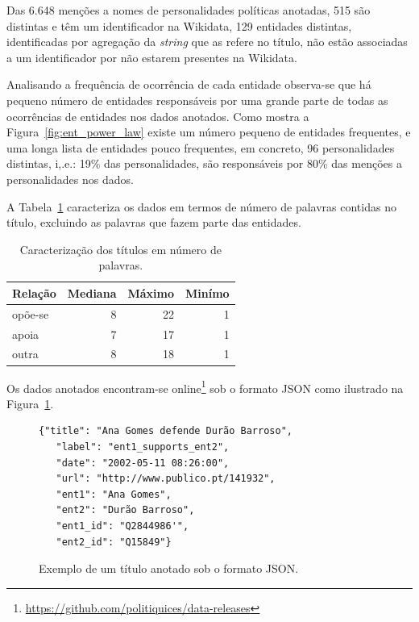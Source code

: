 \documentclass[a4paper, twocolumn, 11pt, twoside]{article}
\begin{document}
Das 6.648 menções a nomes de personalidades políticas anotadas, 515 são distintas e têm um identificador na Wikidata, 129 entidades distintas, identificadas por agregação da \textit{string} que as refere no título, não estão associadas a um identificador por não estarem presentes na Wikidata. 

Analisando a frequência de ocorrência de cada entidade observa-se que há pequeno número de entidades responsáveis por uma grande parte de todas as ocorrências de entidades nos dados anotados. Como mostra a Figura~\ref{fig:ent_power_law} existe um número pequeno de entidades frequentes, e uma longa lista de entidades pouco frequentes, em concreto, 96 personalidades distintas, i,.e.: 19\% das personalidades, são responsáveis por 80\% das menções a personalidades nos dados.

A Tabela~\ref{tab:caracterization_rel_dataset} caracteriza os dados em termos de número de palavras contidas no título, excluindo as palavras que fazem parte das entidades.


\begin{table}[]
    \begin{center}
    \begin{tabular}{l rrr}
        {\bf Relação} & {\bf Mediana} & {\bf Máximo} & {\bf Minímo} \\
        \hline
        opõe-se       &    8 &  22   &  1   \\
        apoia         &    7 &  17   &  1  \\
        outra         &    8 &  18   &  1  \\
    \end{tabular}
	\caption{Caracterização dos títulos em número de palavras.}
	\label{tab:caracterization_rel_dataset}
	\end{center}
\end{table}

Os dados anotados encontram-se online\footnote{\url{https://github.com/politiquices/data-releases}} sob o formato JSON como ilustrado na Figura~\ref{fig:json_sample}.

\begin{figure}[]
\begin{Verbatim}[fontsize=\small]
  {"title": "Ana Gomes defende Durão Barroso",
   "label": "ent1_supports_ent2",
   "date": "2002-05-11 08:26:00",
   "url": "http://www.publico.pt/141932",
   "ent1": "Ana Gomes",
   "ent2": "Durão Barroso",
   "ent1_id": "Q2844986'",
   "ent2_id": "Q15849"}
\end{Verbatim}
  \caption{Exemplo de um título anotado sob o formato JSON.}
  \label{fig:json_sample}
\end{figure}
\end{document}
